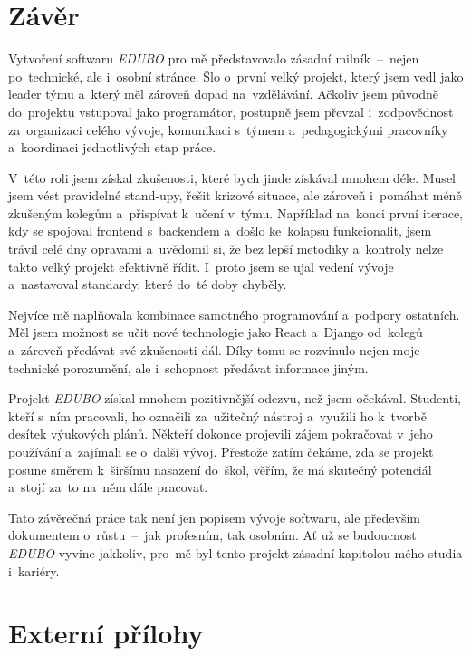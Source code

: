 \documentclass[male,czech,api_bc]{kitheses}
\begin{document}
\chapter{Závěr}

Vytvoření softwaru \textit{EDUBO} pro mě představovalo zásadní milník~--~nejen po~technické, ale i~osobní stránce. Šlo o~první velký projekt, který jsem vedl jako leader týmu a~který měl zároveň dopad na~vzdělávání. Ačkoliv jsem původně do~projektu vstupoval jako programátor, postupně jsem převzal i~zodpovědnost za~organizaci celého vývoje, komunikaci s~týmem a~pedagogickými pracovníky a~koordinaci jednotlivých etap práce.

V~této roli jsem získal zkušenosti, které bych jinde získával mnohem déle. Musel jsem vést pravidelné stand-upy, řešit krizové situace, ale zároveň i~pomáhat méně zkušeným kolegům a~přispívat k~učení v~týmu. Například na~konci první iterace, kdy se spojoval frontend s~backendem a~došlo ke~kolapsu funkcionalit, jsem trávil celé dny opravami a~uvědomil si, že bez lepší metodiky a~kontroly nelze takto velký projekt efektivně řídit. I~proto jsem se ujal vedení vývoje a~nastavoval standardy, které do~té doby chyběly.

Nejvíce mě naplňovala kombinace samotného programování a~podpory ostatních. Měl jsem možnost se učit nové technologie jako React a~Django od~kolegů a~zároveň předávat své zkušenosti dál. Díky tomu se rozvinulo nejen moje technické porozumění, ale i~schopnost předávat informace jiným.

Projekt \textit{EDUBO} získal mnohem pozitivnější odezvu, než jsem očekával. Studenti, kteří s~ním pracovali, ho označili za~užitečný nástroj a~využili ho k~tvorbě desítek výukových plánů. Někteří dokonce projevili zájem pokračovat v~jeho používání a~zajímali se o~další vývoj. Přestože zatím čekáme, zda se projekt posune směrem k~širšímu nasazení do~škol, věřím, že má skutečný potenciál a~stojí za~to na~něm dále pracovat.

Tato závěrečná práce tak není jen popisem vývoje softwaru, ale především dokumentem o~růstu~--~jak profesním, tak osobním. Ať už se budoucnost \textit{EDUBO} vyvine jakkoliv, pro~mě byl tento projekt zásadní kapitolou mého studia i~kariéry.


\sloppy
\printbibliography[title=Seznam použitých zdrojů]

\chapter{Externí přílohy}
\end{document}
